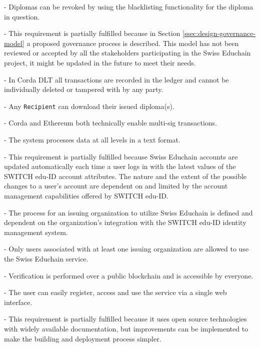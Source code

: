 \begin{description}[leftmargin=40pt]
	\item[RQ12] - Diplomas can be revoked by using the blacklisting functionality for the diploma in question.
	
	\item[RQ13] - This requirement is partially fulfilled because in Section \ref{ssec:design-governance-model} a proposed governance process is described. This model has not been reviewed or accepted by all the stakeholders participating in the Swiss Educhain project, it might be updated in the future to meet their needs.
	
	\item[RQ14] - In Corda DLT all transactions are recorded in the ledger and cannot be individually deleted or tampered with by any party.
	
	\item[RQ15] - Any \texttt{Recipient} can download their issued diploma(s).
	
	\item[RQ16] - Corda and Ethereum both technically enable multi-sig transactions.
	
	\item[RQ17] - The system processes data at all levels in a text format.
	
	\item[RQ18] - This requirement is partially fulfilled because Swiss Educhain accounts are updated automatically each time a user logs in with the latest values of the SWITCH edu-ID account attributes. The nature and the extent of the possible changes to a user's account are dependent on and limited by the account management capabilities offered by SWITCH edu-ID.
	
	\item[RQ19] - The process for an issuing organization to utilize Swiss Educhain is defined and dependent on the organization's integration with the SWITCH edu-ID identity management system.
	
	\item[RQ20] - Only users associated with at least one issuing organization are allowed to use the Swiss Educhain service.
	
	\item[RQ21] - Verification is performed over a public blockchain and is accessible by everyone.
	
	\item[RQ22] - The user can easily register, access and use the service via a single web interface.
	
	\item[RQ23] - This requirement is partially fulfilled because it uses open source technologies with widely available documentation, but improvements can be implemented to make the building and deployment process simpler.
	

\end{description}
